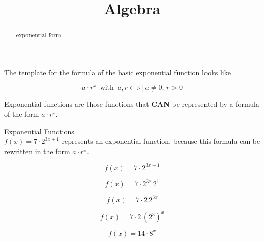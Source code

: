 \documentclass{ximera}
\title{Algebra}
\begin{document}
\begin{abstract}
exponential form
\end{abstract}
\maketitle










The template for the formula of the basic exponential function looks like



\[  a \cdot r^x   \, \text{ with } \,  a, r \in \mathbb{R} \, | \,  a \ne 0, \, r > 0   \]




Exponential functions are those functions that \textbf{\textcolor{red!80!black}{CAN}} be represented by a formula of the form $a \cdot r^x$.
















\begin{example}  Exponential Functions \\



$f(x) = 7 \cdot 2^{3x+1} $ represents an exponential function, because this formula can be rewritten in the form $a \cdot r^x$.   \\


\begin{explanation}


\[
f(x) = 7 \cdot 2^{3x+1}
\]


\[
f(x) = 7 \cdot 2^{3x}  \, 2^1
\]

\[
f(x) = 7 \cdot 2 \, 2^{3x} 
\]

\[
f(x) = 7 \cdot 2 \, (2^3)^x 
\]

\[
f(x) = 14 \cdot 8^x 
\]


\end{explanation}

\end{example}
\end{document}
